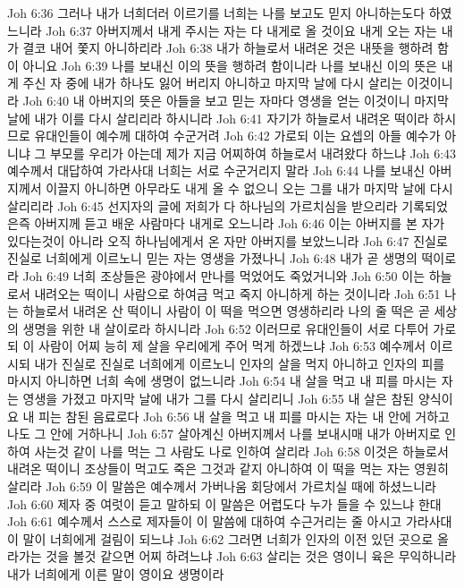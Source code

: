 Joh 6:36  그러나 내가 너희더러 이르기를 너희는 나를 보고도 믿지 아니하는도다 하였느니라
Joh 6:37  아버지께서 내게 주시는 자는 다 내게로 올 것이요 내게 오는 자는 내가 결코 내어 쫓지 아니하리라
Joh 6:38  내가 하늘로서 내려온 것은 내뜻을 행하려 함이 아니요
Joh 6:39  나를 보내신 이의 뜻을 행하려 함이니라 나를 보내신 이의 뜻은 내게 주신 자 중에 내가 하나도 잃어 버리지 아니하고 마지막 날에 다시 살리는 이것이니라
Joh 6:40  내 아버지의 뜻은 아들을 보고 믿는 자마다 영생을 얻는 이것이니 마지막 날에 내가 이를 다시 살리리라 하시니라
Joh 6:41  자기가 하늘로서 내려온 떡이라 하시므로 유대인들이 예수께 대하여 수군거려
Joh 6:42  가로되 이는 요셉의 아들 예수가 아니냐 그 부모를 우리가 아는데 제가 지금 어찌하여 하늘로서 내려왔다 하느냐
Joh 6:43  예수께서 대답하여 가라사대 너희는 서로 수군거리지 말라
Joh 6:44  나를 보내신 아버지께서 이끌지 아니하면 아무라도 내게 올 수 없으니 오는 그를 내가 마지막 날에 다시 살리리라
Joh 6:45  선지자의 글에 저희가 다 하나님의 가르치심을 받으리라 기록되었은즉 아버지께 듣고 배운 사람마다 내게로 오느니라
Joh 6:46  이는 아버지를 본 자가 있다는것이 아니라 오직 하나님에게서 온 자만 아버지를 보았느니라
Joh 6:47  진실로 진실로 너희에게 이르노니 믿는 자는 영생을 가졌나니
Joh 6:48  내가 곧 생명의 떡이로라
Joh 6:49  너희 조상들은 광야에서 만나를 먹었어도 죽었거니와
Joh 6:50  이는 하늘로서 내려오는 떡이니 사람으로 하여금 먹고 죽지 아니하게 하는 것이니라
Joh 6:51  나는 하늘로서 내려온 산 떡이니 사람이 이 떡을 먹으면 영생하리라 나의 줄 떡은 곧 세상의 생명을 위한 내 살이로라 하시니라
Joh 6:52  이러므로 유대인들이 서로 다투어 가로되 이 사람이 어찌 능히 제 살을 우리에게 주어 먹게 하겠느냐
Joh 6:53  예수께서 이르시되 내가 진실로 진실로 너희에게 이르노니 인자의 살을 먹지 아니하고 인자의 피를 마시지 아니하면 너희 속에 생명이 없느니라
Joh 6:54  내 살을 먹고 내 피를 마시는 자는 영생을 가졌고 마지막 날에 내가 그를 다시 살리리니
Joh 6:55  내 살은 참된 양식이요 내 피는 참된 음료로다
Joh 6:56  내 살을 먹고 내 피를 마시는 자는 내 안에 거하고 나도 그 안에 거하나니
Joh 6:57  살아계신 아버지께서 나를 보내시매 내가 아버지로 인하여 사는것 같이 나를 먹는 그 사람도 나로 인하여 살리라
Joh 6:58  이것은 하늘로서 내려온 떡이니 조상들이 먹고도 죽은 그것과 같지 아니하여 이 떡을 먹는 자는 영원히 살리라
Joh 6:59  이 말씀은 예수께서 가버나움 회당에서 가르치실 때에 하셨느니라
Joh 6:60  제자 중 여럿이 듣고 말하되 이 말씀은 어렵도다 누가 들을 수 있느냐 한대
Joh 6:61  예수께서 스스로 제자들이 이 말씀에 대하여 수근거리는 줄 아시고 가라사대 이 말이 너희에게 걸림이 되느냐
Joh 6:62  그러면 너희가 인자의 이전 있던 곳으로 올라가는 것을 볼것 같으면 어찌 하려느냐
Joh 6:63  살리는 것은 영이니 육은 무익하니라 내가 너희에게 이른 말이 영이요 생명이라
